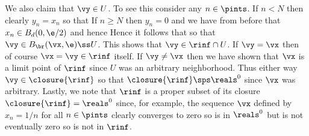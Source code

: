 {{    We also claim that $\vy \in U$.
    To see this consider any $n \in \pints$.
    If $n < N$ then clearly $y_n = x_n$ so that
    If $n \geq N$ then $y_n = 0$ and we have from before that $x_n \in B_d(0, \e/2)$ and hence
    Hence it follows that
    so that $\vy \in B_{\br}(\vx, \e) \ss U$.
    This shows that $\vy \in \rinf \cap U$.
    If $\vy = \vx$ then of course $\vx = \vy \in \rinf$ itself.
    If $\vy \neq \vx$ then we have shown that $\vx$ is a limit point of $\rinf$ since $U$ was an arbitrary neighborhood.
    Thus either way $\vy \in \closure{\rinf}$ so that $\closure{\rinf} \sps \reals^0$ since $\vx$ was arbitrary.
  }
  Lastly, we note that $\rinf$ is a proper subset of its closure $\closure{\rinf} = \reals^0$ since, for example, the sequence $\vx$ defined by $x_n = 1/n$ for all $n \in \pints$ clearly converges to zero so is in $\reals^0$ but is not eventually zero so is not in $\rinf$.
}

